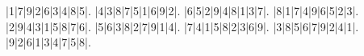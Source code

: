 \begin{sudoku}
|1|7|9|2|6|3|4|8|5|.
|4|3|8|7|5|1|6|9|2|.
|6|5|2|9|4|8|1|3|7|.
|8|1|7|4|9|6|5|2|3|.
|2|9|4|3|1|5|8|7|6|.
|5|6|3|8|2|7|9|1|4|.
|7|4|1|5|8|2|3|6|9|.
|3|8|5|6|7|9|2|4|1|.
|9|2|6|1|3|4|7|5|8|.
\end{sudoku}